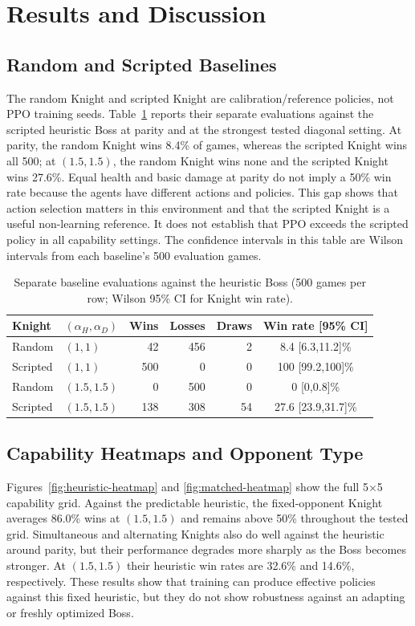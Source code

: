 \documentclass{article}
\begin{document}
\section{Results and Discussion}
\subsection{Random and Scripted Baselines}
The random Knight and scripted Knight are calibration/reference policies, not PPO training seeds. Table~\ref{tab:baselines} reports their separate evaluations against the scripted heuristic Boss at parity and at the strongest tested diagonal setting. At parity, the random Knight wins 8.4\% of games, whereas the scripted Knight wins all 500; at $(1.5,1.5)$, the random Knight wins none and the scripted Knight wins 27.6\%. Equal health and basic damage at parity do not imply a 50\% win rate because the agents have different actions and policies. This gap shows that action selection matters in this environment and that the scripted Knight is a useful non-learning reference. It does not establish that PPO exceeds the scripted policy in all capability settings. The confidence intervals in this table are Wilson intervals from each baseline's 500 evaluation games.

\begin{table}[t]
\centering
\caption{Separate baseline evaluations against the heuristic Boss (500 games per row; Wilson 95\% CI for Knight win rate).}
\label{tab:baselines}
\small
\begin{tabular}{llrrrc}
\toprule
Knight & $(\alpha_H,\alpha_D)$ & Wins & Losses & Draws & Win rate [95\% CI] \\
\midrule
Random & $(1,1)$ & 42 & 456 & 2 & 8.4 [6.3,11.2]\% \\
Scripted & $(1,1)$ & 500 & 0 & 0 & 100 [99.2,100]\% \\
Random & $(1.5,1.5)$ & 0 & 500 & 0 & 0 [0,0.8]\% \\
Scripted & $(1.5,1.5)$ & 138 & 308 & 54 & 27.6 [23.9,31.7]\% \\
\bottomrule
\end{tabular}
\end{table}

\subsection{Capability Heatmaps and Opponent Type}
Figures~\ref{fig:heuristic-heatmap} and \ref{fig:matched-heatmap} show the full 5$\times$5 capability grid. Against the predictable heuristic, the fixed-opponent Knight averages 86.0\% wins at $(1.5,1.5)$ and remains above 50\% throughout the tested grid. Simultaneous and alternating Knights also do well against the heuristic around parity, but their performance degrades more sharply as the Boss becomes stronger. At $(1.5,1.5)$ their heuristic win rates are 32.6\% and 14.6\%, respectively. These results show that training can produce effective policies against this fixed heuristic, but they do not show robustness against an adapting or freshly optimized Boss.
\end{document}
